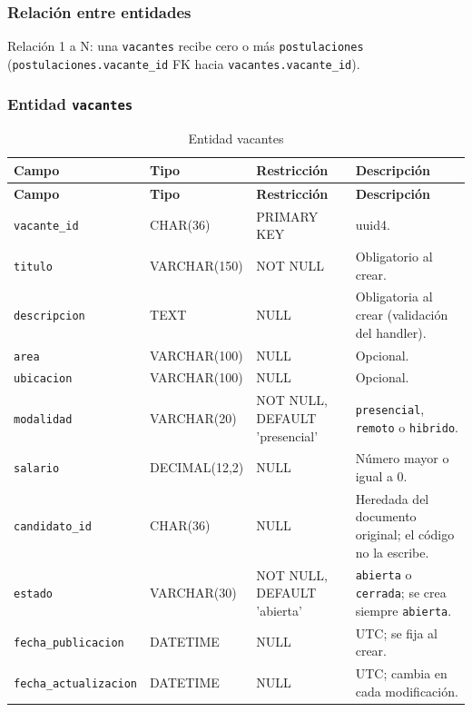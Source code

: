 \subsubsection{Relación entre entidades}
Relación 1 a N: una \texttt{vacantes} recibe cero o más \texttt{postulaciones} (\texttt{postulaciones.vacante\_\allowbreak{}id} FK hacia \texttt{vacantes.vacante\_\allowbreak{}id}).

\subsubsection{Entidad \texttt{vacantes}}
\begin{longtable}{p{3cm}p{2.7cm}p{3.6cm}p{4.7cm}}
\caption{Entidad vacantes}\\
\toprule
\textbf{Campo} & \textbf{Tipo} & \textbf{Restricción} & \textbf{Descripción} \\
\midrule
\endfirsthead
\toprule
\textbf{Campo} & \textbf{Tipo} & \textbf{Restricción} & \textbf{Descripción} \\
\midrule
\endhead
\bottomrule
\endlastfoot
\texttt{vacante\_\allowbreak{}id} & CHAR(36) & PRIMARY KEY & uuid4. \\
\texttt{titulo} & VARCHAR(150) & NOT NULL & Obligatorio al crear. \\
\texttt{descripcion} & TEXT & NULL & Obligatoria al crear (validación del handler). \\
\texttt{area} & VARCHAR(100) & NULL & Opcional. \\
\texttt{ubicacion} & VARCHAR(100) & NULL & Opcional. \\
\texttt{modalidad} & VARCHAR(20) & NOT NULL, DEFAULT 'presencial' & \texttt{presencial}, \texttt{remoto} o \texttt{hibrido}. \\
\texttt{salario} & DECIMAL(12,2) & NULL & Número mayor o igual a 0. \\
\texttt{candidato\_\allowbreak{}id} & CHAR(36) & NULL & Heredada del documento original; el código no la escribe. \\
\texttt{estado} & VARCHAR(30) & NOT NULL, DEFAULT 'abierta' & \texttt{abierta} o \texttt{cerrada}; se crea siempre \texttt{abierta}. \\
\texttt{fecha\_\allowbreak{}publicacion} & DATETIME & NULL & UTC; se fija al crear. \\
\texttt{fecha\_\allowbreak{}actualizacion} & DATETIME & NULL & UTC; cambia en cada modificación. \\
\end{longtable}

